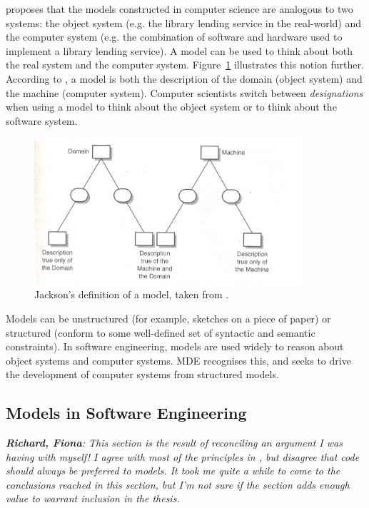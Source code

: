 \cite{jackson95software} proposes that the models constructed in computer science are analogous to two systems: the object system (e.g. the library lending service in the real-world) and the computer system (e.g. the combination of software and hardware used to implement a library lending service). A model can be used to think about both the real system and the computer system. Figure~\ref{fig:jackson_model} illustrates this notion further. According to \cite{jackson95software}, a model is both the description of the domain (object system) and the machine (computer system). Computer scientists switch between \emph{designations} when using a model to think about the object system or to think about the software system.

\begin{figure}[htbp]
  \begin{center}
    \leavevmode
    \includegraphics[width=10cm]{2.Background/images/jackson_model.png}
  \end{center}
  \caption{Jackson's definition of a model, taken from \cite[pg.125]{jackson95software}.}
  \label{fig:jackson_model}
\end{figure}

Models can be unstructured (for example, sketches on a piece of paper) or structured (conform to some well-defined set of syntactic and semantic constraints). In software engineering, models are used widely to reason about object systems and computer systems. MDE recognises this, and seeks to drive the development of computer systems from structured models.

\subsection{Models in Software Engineering}

\emph{\textbf{Richard, Fiona}: This section is the result of reconciling an argument  I was having with myself! I agree with most of the principles in \cite{martin06agile}, but disagree that code should always be preferred to models. It took me quite a while to come to the conclusions reached in this section, but I'm not sure if the section adds enough value to warrant inclusion in the thesis.} \vspace{4mm}

